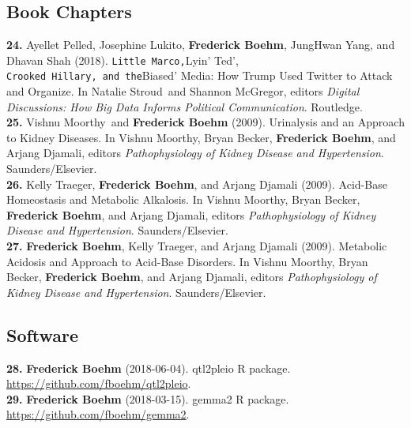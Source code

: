 \documentclass[
  10pt,
]
{article}
\begin{document}
\subsection{Book Chapters}\label{book-chapters}

\textbf{24.} \normalsize \normalsize Ayellet Pelled\normalsize ,
\normalsize Josephine Lukito\normalsize ,
\textbf{\normalsize Frederick Boehm}\normalsize , \normalsize JungHwan
Yang\normalsize , and \normalsize Dhavan Shah (2018).
\texttt{Little\ Marco\textquotesingle{},}Lyin' Ted',
\texttt{Crooked\ Hillary\textquotesingle{},\ and\ the}Biased' Media: How
Trump Used Twitter to Attack and Organize. In \normalsize Natalie
Stroud\normalsize ~and \normalsize Shannon McGregor, editors
\emph{Digital Discussions: How Big Data Informs Political
Communication}. Routledge.\\
\textbf{25.} \normalsize \normalsize Vishnu Moorthy\normalsize ~and
\textbf{\normalsize Frederick Boehm} (2009). Urinalysis and an Approach
to Kidney Diseases. In \normalsize Vishnu Moorthy\normalsize ,
\normalsize Bryan Becker\normalsize ,
\textbf{\normalsize Frederick Boehm}\normalsize , and \normalsize Arjang
Djamali, editors \emph{Pathophysiology of Kidney Disease and
Hypertension}. Saunders/Elsevier.\\
\textbf{26.} \normalsize \normalsize Kelly Traeger\normalsize ,
\textbf{\normalsize Frederick Boehm}\normalsize , and \normalsize Arjang
Djamali (2009). Acid-Base Homeostasis and Metabolic Alkalosis. In
\normalsize Vishnu Moorthy\normalsize , \normalsize Bryan
Becker\normalsize , \textbf{\normalsize Frederick Boehm}\normalsize ,
and \normalsize Arjang Djamali, editors \emph{Pathophysiology of Kidney
Disease and Hypertension}. Saunders/Elsevier.\\
\textbf{27.}
\normalsize \textbf{\normalsize Frederick Boehm}\normalsize ,
\normalsize Kelly Traeger\normalsize , and \normalsize Arjang Djamali
(2009). Metabolic Acidosis and Approach to Acid-Base Disorders. In
\normalsize Vishnu Moorthy\normalsize , \normalsize Bryan
Becker\normalsize , \textbf{\normalsize Frederick Boehm}\normalsize ,
and \normalsize Arjang Djamali, editors \emph{Pathophysiology of Kidney
Disease and Hypertension}. Saunders/Elsevier.

\subsection{Software}\label{software}

\textbf{28.} \normalsize \textbf{\normalsize Frederick Boehm}
(2018-06-04). qtl2pleio R package.
\url{https://github.com/fboehm/qtl2pleio}.\\
\textbf{29.} \normalsize \textbf{\normalsize Frederick Boehm}
(2018-03-15). gemma2 R package. \url{https://github.com/fboehm/gemma2}.
\end{document}
